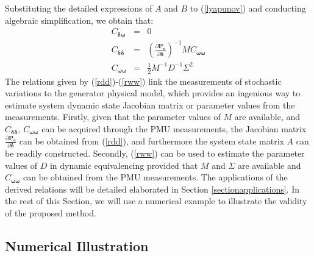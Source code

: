 \documentclass[journal]{IEEEtran}
\begin{document}
Substituting the detailed expressions of $A$ and $B$ to (\ref{lyapunov}) and conducting algebraic simplification, we obtain that:
\begin{eqnarray}
C_{\bm{\delta}{\bm{\omega}}}&=&0\\
C_{\bm{\delta}{\bm{\delta}}}&=&(\frac{\partial{\bm{P_e}}}{\partial{\bm{\delta}}})^{-1}MC_{\bm{\omega}{\bm{\omega}}}\label{rdd}\\
C_{\bm{\omega}{\bm{\omega}}}&=&\frac{1}{2}M^{-1}D^{-1}\Sigma^2\label{rww}
\end{eqnarray}
The relations given by (\ref{rdd})-(\ref{rww}) link the measurements of stochastic variations to the generator physical model, which provides an ingenious way to estimate system dynamic state Jacobian matrix or parameter values from the measurements. Firstly, given that the parameter values of $M$ are available, and $C_{\bm{\delta}\bm{\delta}}$, $C_{\bm{\omega}{\bm{\omega}}}$ can be acquired through the PMU measurements, the Jacobian matrix $\frac{\partial{\bm{P_e}}}{\partial{\bm{\delta}}}$ can be obtained from (\ref{rdd}), and furthermore the system state matrix $A$ can be readily constructed. Secondly, (\ref{rww}) can be used to estimate the parameter values of $D$ in dynamic equivalencing provided that $M$ and $\Sigma$ are available and $C_{\bm{\omega}{\bm{\omega}}}$ can be obtained from the PMU measurements. The applications of the derived relations will be detailed elaborated in Section \ref{sectionapplications}. In the rest of this Section, we will use a numerical example to illustrate the validity of the proposed method.

\subsection{Numerical Illustration}
\end{document}
